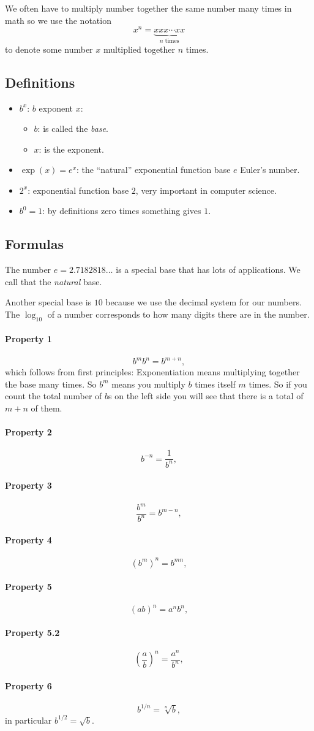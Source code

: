 \documentclass[journal]{IEEEtran}
\newcommand{\dokutitleleveltree}[1]{\subsection{#1}}
\newcommand{\dokutitlelevelfive}[1]{\paragraph{#1}}
\newcommand{\dokuitalic}[1]{\textsl{#1}}
\newcommand{\dokuitem}{\item}
\begin{document}
We often have to multiply number together the same number many times
in math so we use the notation
\[
  x^n  = \underbrace{xxx \cdots xx}_{n \text{ times} }
\]
to denote some number \(x\) multiplied together \(n\) times.


\dokutitleleveltree{Definitions}
\label{9fdc1f6b239f0e86ec8651552f2b0683}%

\begin{itemize}
\dokuitem  \(b^x\): \(b\) exponent \(x\):
\begin{itemize}
\dokuitem  \(b\): is called the \dokuitalic{base}.
\dokuitem  \(x\): is the exponent.
\end{itemize}

\dokuitem  \(\exp(x)=e^x\): the ``natural'' exponential function base \(e\)  Euler's number.
\dokuitem  \(2^x\): exponential function base \(2\), very important in computer science.
\dokuitem  \(b^0=1\): by definitions zero times something gives \(1\).
\end{itemize}

\dokutitleleveltree{Formulas}
\label{51d24e1edefe34e683025dbba5c6eed6}%

The number \(e=2.7182818\ldots\) is a special base that has lots of applications.
We call that the \dokuitalic{natural} base.

Another special base is \(10\) because we use the decimal
system for our numbers.
The \(\log_{10}\) of a number corresponds to 
how many digits there are in the number. 


\dokutitlelevelfive{Property 1}

\[
   b^m b^n = b^{m+n},
\]
which follows from first principles:
Exponentiation means multiplying together the base many times.
So \(b^m\) means you multiply \(b\) times itself \(m\) times. So if you
count the total number of \(b\)s on the left side you will see that
there is a total of \(m+n\) of them.


\dokutitlelevelfive{Property 2}
\[
   b^{-n} = \frac{1}{b^n},
\]


\dokutitlelevelfive{Property 3}
\[
   \frac{b^m}{b^n} = b^{m-n},
\]


\dokutitlelevelfive{Property 4}
\[
   ({b^m})^n = b^{mn},
\]


\dokutitlelevelfive{Property 5}
\[
   (ab)^n = a^n b^n,
\]


\dokutitlelevelfive{Property 5.2}
\[
   \left(\frac{a}{b}\right)^n = \frac{a^n}{b^n},
\]


\dokutitlelevelfive{Property 6}
\[
  b^{1/n} = \sqrt[n]{b},
\]
in particular \(b^{1/2}=\sqrt{b}\).
\end{document}
